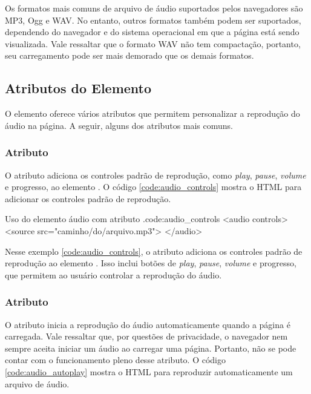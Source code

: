 Os formatos mais comuns de arquivo de áudio suportados pelos navegadores são MP3, Ogg e WAV. No entanto, outros formatos também podem ser suportados, dependendo do navegador e do sistema operacional em que a página está sendo visualizada. Vale ressaltar que o formato WAV não tem compactação, portanto, seu carregamento pode ser mais demorado que os demais formatos.

\subsection{Atributos do Elemento }

O elemento  oferece vários atributos que permitem personalizar a reprodução do áudio na página. A seguir, alguns dos atributos mais comuns.

\subsubsection{Atributo }

O atributo  adiciona os controles padrão de reprodução, como \textit{play}, \textit{pause}, \textit{volume} e progresso, ao elemento . O código \ref{code:audio_controls} mostra o HTML para adicionar os controles padrão de reprodução.

\begin{htmlcode}{Uso do elemento áudio com atributo .}{code:audio_controls}
<audio controls>
  <source src="caminho/do/arquivo.mp3">
</audio>
\end{htmlcode}

Nesse exemplo \ref{code:audio_controls}, o atributo  adiciona os controles padrão de reprodução ao elemento . Isso inclui botões de \textit{play}, \textit{pause}, \textit{volume} e progresso, que permitem ao usuário controlar a reprodução do áudio.

\subsubsection{Atributo }

O atributo  inicia a reprodução do áudio automaticamente quando a página é carregada. Vale ressaltar que, por questões de privacidade, o navegador nem sempre aceita iniciar um áudio ao carregar uma página. Portanto, não se pode contar com o funcionamento pleno desse atributo. O código \ref{code:audio_autoplay} mostra o HTML para reproduzir automaticamente um arquivo de áudio.

